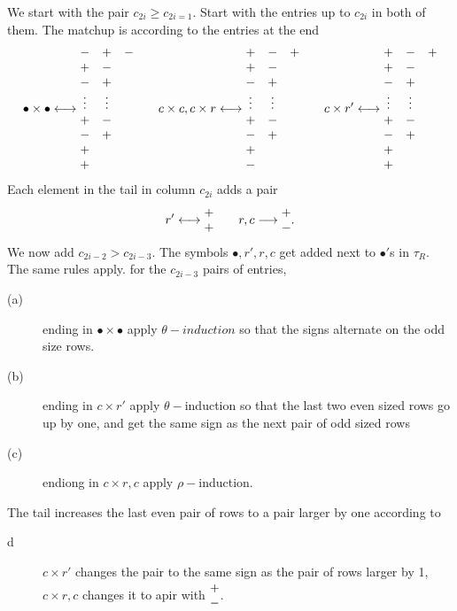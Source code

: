 \documentclass[11pt ,reqno]{amsart}
\begin{document}
We start with the pair $c_{2i}\ge c_{2i=1}.$ Start with the entries up
to $c_{2i}$ in both of them. The matchup is according to the entries
at the end
$$
\bullet\times\bullet\longleftrightarrow
\begin{matrix}
-&+&-\\
+&-& \\
-&+ & \\
\vdots&\vdots &\\
+&-& \\
-&+ & \\
+ &&\\
+ &&\\
\end{matrix}
\qquad
c\times c, c\times r\longleftrightarrow
\begin{matrix}
+&-&+\\
+&-& \\
-&+ & \\
\vdots&\vdots &\\
+&-& \\
-&+ & \\
+ &&\\
- &&\\
\end{matrix}
\qquad
c\times r'\longleftrightarrow
\begin{matrix}
+&-&+\\
+&-& \\
-&+ & \\
\vdots&\vdots &\\
+&-& \\
-&+ & \\
+ &&\\
+ &&\\
\end{matrix}
$$
Each element in the tail in column $c_{2i}$ adds a pair
$$
r'\longleftrightarrow \begin{matrix} +\\+\end{matrix}\qquad r,c\longrightarrow \begin{matrix} +\\-\end{matrix}.
$$
We now add $c_{2i-2}>c_{2i-3}.$ The symbols $\bullet,r',r,c$ get added
next to $\bullet'$s in $\tau_R$. The same rules apply. for the
$c_{2i-3}$ pairs of entries, 
\begin{description}
\item[(a)] ending in $\bullet\times\bullet$ apply $\theta-induction$ so that the
  signs alternate on the odd size rows.
\item[(b)] ending in $c\times r'$ apply $\theta-$induction so that the
  last two even sized rows go up by one, and get the same sign as the
  next pair of odd sized rows
\item[(c)] endiong in $c\times r,c$ apply $\rho-$induction.  
\end{description}
The tail increases the last even pair of rows to a pair larger by one according to
\begin{description}
\item[d] $c\times r'$ changes the pair to the same sign as the pair of
  rows larger by 1, $c\times r,c$ changes it to apir with $\begin{matrix} +\\-\end{matrix}$.
\end{description}
\end{document}
